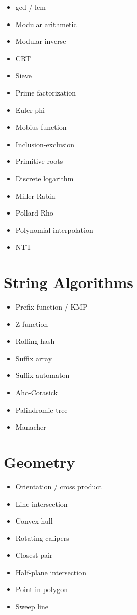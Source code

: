 \begin{itemize}
  \item gcd / lcm
  \item Modular arithmetic
  \item Modular inverse
  \item CRT
  \item Sieve
  \item Prime factorization
  \item Euler phi
  \item Mobius function
  \item Inclusion-exclusion
  \item Primitive roots
  \item Discrete logarithm
  \item Miller-Rabin
  \item Pollard Rho
  \item Polynomial interpolation
  \item NTT
\end{itemize}

\section*{String Algorithms}

\begin{itemize}
  \item Prefix function / KMP
  \item Z-function
  \item Rolling hash
  \item Suffix array
  \item Suffix automaton
  \item Aho-Corasick
  \item Palindromic tree
  \item Manacher
\end{itemize}

\section*{Geometry}

\begin{itemize}
  \item Orientation / cross product
  \item Line intersection
  \item Convex hull
  \item Rotating calipers
  \item Closest pair
  \item Half-plane intersection
  \item Point in polygon
  \item Sweep line
\end{itemize}

